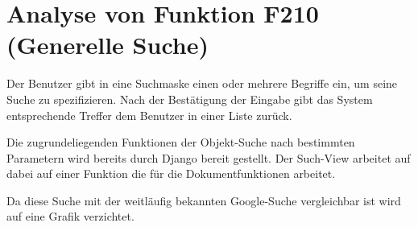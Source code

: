 \section{Analyse von Funktion F210 (Generelle Suche)}
Der Benutzer gibt in eine Suchmaske einen oder mehrere Begriffe ein, um seine
Suche zu spezifizieren. Nach der Bestätigung der Eingabe gibt das System
entsprechende Treffer dem Benutzer in einer Liste zurück.

Die zugrundeliegenden Funktionen der Objekt-Suche nach bestimmten Parametern
wird bereits durch Django bereit gestellt. Der Such-View arbeitet auf dabei auf
einer Funktion die für die Dokumentfunktionen arbeitet.

Da diese Suche mit der weitläufig bekannten Google-Suche vergleichbar ist wird
auf eine Grafik verzichtet.
